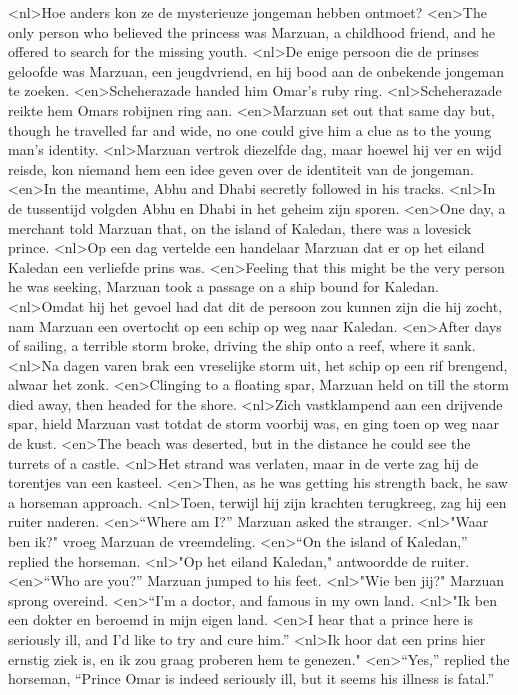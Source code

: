 <nl>Hoe anders kon ze de mysterieuze jongeman hebben ontmoet?
<en>The only person who believed the princess was Marzuan, a childhood friend, and he offered to search for the missing youth.
<nl>De enige persoon die  de prinses geloofde was Marzuan, een jeugdvriend, en hij bood aan de onbekende jongeman te zoeken.
<en>Scheherazade handed him Omar’s ruby ring.
<nl>Scheherazade reikte hem Omars robijnen ring aan.
<en>Marzuan set out that same day but, though he travelled far and wide, no one could give him a clue as to the young man’s identity.
<nl>Marzuan vertrok diezelfde dag, maar hoewel hij ver en wijd reisde, kon niemand hem een idee geven over de identiteit van de jongeman.
<en>In the meantime, Abhu and Dhabi secretly followed in his tracks.
<nl>In de tussentijd volgden Abhu en Dhabi in het geheim zijn sporen.
<en>One day, a merchant told Marzuan that, on the island of Kaledan, there was a lovesick prince.
<nl>Op een dag vertelde een handelaar Marzuan dat er op het eiland Kaledan een verliefde prins was.
<en>Feeling that this might be the very person he was seeking, Marzuan took a passage on a ship bound for Kaledan.
<nl>Omdat hij het gevoel had dat dit de persoon zou kunnen zijn die hij zocht, nam Marzuan  een overtocht op een schip op weg naar Kaledan.
<en>After days of sailing, a terrible storm broke, driving the ship onto a reef, where it sank.
<nl>Na dagen varen brak een vreselijke storm uit,  het schip op een rif brengend, alwaar het zonk.
<en>Clinging to a floating spar, Marzuan held on till the storm died away, then headed for the shore.
<nl>Zich vastklampend aan een drijvende spar, hield Marzuan vast totdat de storm voorbij was, en ging toen op weg naar de kust.
<en>The beach was deserted, but in the distance he could see the turrets of a castle.
<nl>Het strand was verlaten, maar in de verte zag hij de torentjes van een kasteel.
<en>Then, as he was getting his strength back, he saw a horseman approach.
<nl>Toen, terwijl hij zijn krachten terugkreeg, zag hij een ruiter naderen.
<en>“Where am I?” Marzuan asked the stranger.
<nl>"Waar ben ik?" vroeg Marzuan de vreemdeling.
<en>“On the island of Kaledan,” replied the horseman.
<nl>"Op het eiland Kaledan," antwoordde de ruiter.
<en>“Who are you?” Marzuan jumped to his feet.
<nl>"Wie ben jij?" Marzuan sprong overeind.
<en>“I’m a doctor, and famous in my own land.
<nl>"Ik ben een dokter en beroemd in mijn eigen land.
<en>I hear that a prince here is seriously ill, and I’d like to try and cure him.”
<nl>Ik hoor dat een prins hier ernstig ziek is, en ik zou graag proberen hem te genezen."
<en>“Yes,” replied the horseman, “Prince Omar is indeed seriously ill, but it seems his illness is fatal.”

